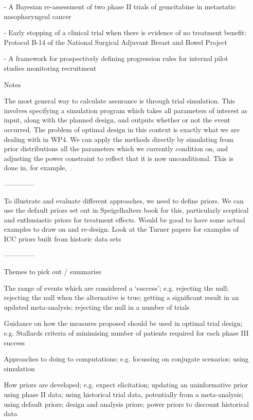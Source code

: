 \documentclass{article} %
\begin{document}
\cite{Tan2002} - A Bayesian re-assessment of two phase II trials of gemcitabine in metastatic nasopharyngeal cancer

\cite{Dignam1998} - Early stopping of a clinical trial when there is evidence of no treatment benefit: Protocol B-14 of the National Surgical Adjuvant Breast and Bowel Project



\cite{Hampson2017} - A framework for prospectively defining progression rules for internal pilot studies monitoring recruitment

Notes

The most general way to calculate assurance is through trial simulation. This involves specifying a simulation program which takes all parameters of interest as input, along with the planned design, and outputs whether or not the event occurred. The problem of optimal design in this context is exactly what we are dealing with in WP4. We can apply the methods directly by simulating from prior distributions all the parameters which we currently condition on, and adjusting the power constraint to reflect that it is now unconditional. This is done in, for example,~\cite{Wang2013}.

--------------

To illustrate and evaluate different approaches, we need to define priors. We can use the default priors set out in Speigelhalters book for this, particularly sceptical and enthusiastic priors for treatment effects. Would be good to have some actual examples to draw on and re-design. Look at the Turner papers for examples of ICC priors built from historic data sets

--------------

Themes to pick out / summarise

The range of events which are considered a `success'; e.g. rejecting the null; rejecting the null when the alternative is true; getting a significant result in an updated meta-analysis; rejecting the null in a number of trials

Guidance on how the measures proposed should be used in optimal trial design; e.g. Stallards criteria of minimising number of patients required for each phase III success

Approaches to doing to computations; e.g. focussing on conjugate scenarios; using simulation

How priors are developed; e.g. expect elicitation; updating an uninformative prior using phase II data; using historical trial data, potentially from a meta-analysis; using default priors; design and analysis priors; power priors to discount historical data
\end{document}
